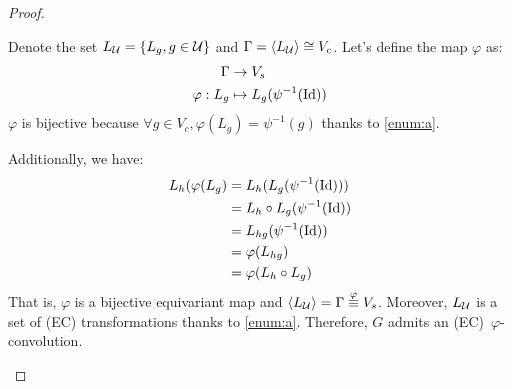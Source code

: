 \begin{proof}
\begin{enumerate}
Denote the set $L_{\mathcal{U}} = \{L_g, g \in \mathcal{U} \}$ and $\Gamma = \langle L_{\mathcal{U}} \rangle \cong V_c$. Let's define the map $\varphi$ as:
\begin{align*}
\Gamma & \rightarrow V_s\\
\varphi: L_g & \mapsto L_g(\psi^{-1}(\operatorname{Id}))
\end{align*}
$\varphi$ is bijective because $\forall g \in V_c, \varphi(L_g) = \psi^{-1}(g)$ thanks to \ref{enum:a}.

Additionally, we have:
\begin{align*}
L_h(\varphi(L_g) & = L_h(L_g(\psi^{-1}(\operatorname{Id})))\\
 & = L_h \circ L_g(\psi^{-1}(\operatorname{Id}))\\
 & = L_{hg}(\psi^{-1}(\operatorname{Id}))\\
 & = \varphi(L_{hg})\\
 & = \varphi(L_h \circ L_g)
\end{align*}
That is, $\varphi$ is a bijective equivariant map and $ \langle L_{\mathcal{U}} \rangle = \Gamma \overset{\varphi}{\equiv} V_s$. Moreover, $L_{\mathcal{U}}$ is a set of (EC) transformations thanks to \ref{enum:a}. Therefore, $G$ admits an (EC)~$\varphi$-convolution.
\end{enumerate}
\end{proof}








